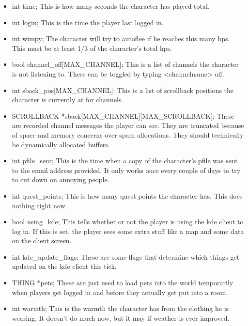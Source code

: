 \begin{itemize}
 \item int time;                    This is how many seconds the
 character has played total.

 \item int login;           This is the time the player last logged in.        

 \item int wimpy;             The character will try to autoflee if he
 reaches this many hps. This must be at least 1/3 of the character's
 total hps.

 \item bool channel\_off[MAX\_CHANNEL]; This is a list of channels the
  character is not listening to. These can be toggled by typing
  <channelname> off.

 \item int sback\_pos[MAX\_CHANNEL];  This is a list of scrollback
 positions the character is currently at for channels.

\item  SCROLLBACK *sback[MAX\_CHANNEL][MAX\_SCROLLBACK]; These are recorded
  channel messages the player can see. They are truncated because of
  space and memory concerns over spam allocations. They should
  technically be dynamically allocated buffers.

 \item int pfile\_sent;            This is the time when a copy of the
 character's pfile was sent to the email address provided. It only
 works once every couple of days to try to cut down on annoying people.

 \item int quest\_points;             This is how many quest points
 the character has. This does nothing right now.

\item  bool using\_kde;               This tells whether or not the player
  is using the kde client to log in. If this is set, the player sees
  some extra stuff like a map and some data on the client screen.

 \item int kde\_update\_flags;        These are some flags that
 determine which things get updated on the kde client this tick.

\item  THING *pets;                 These are just used to load pets into
  the world temporarily when players get logged in and before they
  actually get put into a room.

 \item int warmth;             This is the warmth the character has
 from the clothing he is wearing. It doesn't do much now, but it may
 if weather is ever improved.      


\end{itemize}
